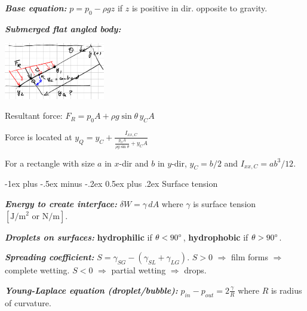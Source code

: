 \documentclass[10pt,landscape,letterpaper]{article}
\makeatletter
\renewcommand{\subsection}{\@startsection{subsection}{2}{0mm}%
                                {-1ex plus -.5ex minus -.2ex}%
                                {0.5ex plus .2ex}%
                                {\normalfont\normalsize\bfseries}}
\newenvironment{Figure}
    {\par\medskip\noindent\minipage{\linewidth}}
    {\endminipage\par\medskip}
\newcommand{\fsheetlabel}[1]{\textcolor{FSheetLabelColor}{\textbf{\textit{#1}}}}
\makeatother
\begin{document}
\begin{multicols*}{3}
\begin{minipage}{\columnwidth}
        \fsheetlabel{Base equation:} $p = p_0 - \rho g z$ if $z$ is positive in dir. opposite to gravity.
        
        \fsheetlabel{Submerged flat angled body:}
        
        \begin{Figure}
            \includegraphics[width=0.33\textwidth]{Angled_Flat_Submerged_Surface_Pressure}
            \centering
        \end{Figure}
        
        Resultant force: $F_R = p_0 A + \rho g \sin{\theta} \,y_C A$
        
        Force is located at $y_Q = y_C + \frac{I_{xx,C}}{\frac{p_0 A}{\rho g \sin{\theta}} + y_C A}$
        
        For a rectangle with size $a$ in $x$-dir and $b$ in $y$-dir, $y_C = b/2$ and $I_{xx,C} = a b^3 / 12$.
    \end{minipage}
    \vspace{2ex plus .5ex minus .5ex}
    
    \begin{minipage}{\columnwidth}\raggedright
        \subsection{Surface tension}
        
        \fsheetlabel{Energy to create interface:} $\delta W = \gamma \,dA$ where $\gamma$ is surface tension $\left[\text{J}/\text{m}^2\text{ or }\text{N}/\text{m}\right]$.
        
        \fsheetlabel{Droplets on surfaces:} \textbf{hydrophilic} if $\theta < 90\degree$, \textbf{hydrophobic} if $\theta > 90\degree$.
        
        \fsheetlabel{Spreading coefficient:} $S = \gamma_{SG} - \left(\gamma_{SL} + \gamma_{LG}\right)$. $S>0$ $\Rightarrow$ film forms $\Rightarrow$ complete wetting. $S<0$ $\Rightarrow$ partial wetting $\Rightarrow$ drops.
        
        \fsheetlabel{Young-Laplace equation (droplet/bubble):} $p_{in} - p_{out} = 2\frac{\gamma}{R}$ where $R$ is radius of curvature.
        

\end{minipage}
\end{multicols*}
\end{document}
